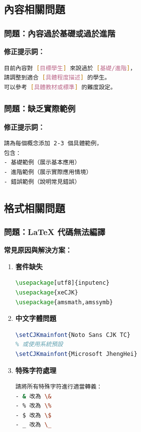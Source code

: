 \documentclass[12pt,a4paper]{article}
\begin{document}
\subsection{內容相關問題}

\subsubsection{問題：內容過於基礎或過於進階}

\textbf{修正提示詞：}
\begin{lstlisting}[language=bash]
目前內容對 [目標學生] 來說過於 [基礎/進階]，
請調整到適合 [具體程度描述] 的學生。
可以參考 [具體教材或標準] 的難度設定。
\end{lstlisting}

\subsubsection{問題：缺乏實際範例}

\textbf{修正提示詞：}
\begin{lstlisting}[language=bash]
請為每個概念添加 2-3 個具體範例，
包含：
- 基礎範例（展示基本應用）
- 進階範例（展示實際應用情境）
- 錯誤範例（說明常見錯誤）
\end{lstlisting}

\subsection{格式相關問題}

\subsubsection{問題：LaTeX 代碼無法編譯}

\textbf{常見原因與解決方案：}

\begin{enumerate}
    \item \textbf{套件缺失}
    \begin{lstlisting}[language=latex]
% 確保包含必要套件
\usepackage[utf8]{inputenc}
\usepackage{xeCJK}
\usepackage{amsmath,amssymb}
    \end{lstlisting}

    \item \textbf{中文字體問題}
    \begin{lstlisting}[language=latex]
% 設定中文字體
\setCJKmainfont{Noto Sans CJK TC}
% 或使用系統預設
\setCJKmainfont{Microsoft JhengHei}
    \end{lstlisting}

    \item \textbf{特殊字符處理}
    \begin{lstlisting}[language=bash]
請將所有特殊字符進行適當轉義：
- & 改為 \&
- % 改為 \%
- $ 改為 \$
- _ 改為 \_
    \end{lstlisting}
\end{enumerate}
\end{document}

